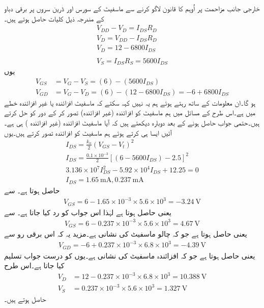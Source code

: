 خارجی جانب مزاحمت پر اُوہم کا قانون لاگو کرنے سے ماسفیٹ کے سورس اور ڈرین سروں پر برقی دباو کے مندرجہ ذیل کلیات حاصل ہوتے ہیں۔
\begin{align*}
V_{DD}-V_{D}=I_{DS}R_D\\
V_D=V_{DD}-I_{DS}R_D\\
V_D=12  - 6800 I_{DS}\\
\\
V_S=I_{DS}R_S=5600I_{DS}
\end{align*}
یوں
\begin{align*}
V_{GS}&=V_G -V_S = (6)-(5600 I_{DS})\\
V_{GD}&=V_G -V_D = (6)-\left(12-6800I_{DS} \right )=-6+6800I_{DS}
\end{align*}
ہو گا۔ان معلومات کے ساتھ رہتے ہوئے ہم یہ نہیں کہہ سکتے کہ ماسفیٹ افزائندہ یا غیر افزائندہ خطے میں ہے۔اس طرح کے مسائل میں ہم ماسفیٹ کو افزائندہ (غیر افزائندہ) تصور کر کے دور کو حل کرتے ہیں۔حتمی جواب حاصل ہونے کے بعد دوبارہ دیکھتے ہیں کہ آیا ماسفیٹ افزائندہ (غیر افزائندہ ) ہی ہے۔آئیں ایسا ہی کرتے ہوئے ہم ماسفیٹ کو افزائندہ تصور کرتے ہیں۔یوں
\begin{align*}
I_{DS}=\frac{k_n}{2} \left (V_{GS}-V_t \right )^{2}\\
I_{DS}=\frac{0.1 \times 10^{-3}}{2} \left[\left(6-5600 I_{DS}\right)-2.5 \right ]^2 \\
3.136 \times 10^{7} I_{DS}^{2}-5.92 \times 10^{4} I_{DS}+12.25=0\\
I_{DS}=\SI{1.65}{\milli \ampere} , \SI{0.237}{\milli \ampere}
\end{align*}
حاصل ہوتا ہے۔   سے 
\begin{align*}
V_{GS}=6-1.65 \times 10^{-3} \times 5.6 \times 10^{3}=\SI{-3.24}{\volt}
\end{align*}
یعنی   حاصل ہوتا ہے لہٰذا اس جواب کو رد کیا جاتا ہے۔  سے
\begin{align*}
V_{GS}=6-0.237 \times 10^{-3} \times 5.6 \times 10^{3}=\SI{4.67}{\volt}
\end{align*}
یعنی   حاصل ہوتا ہے جو کہ چالو ماسفیٹ کی نشانی ہے۔مزید یہ کہ اس برقی رو سے
\begin{align*}
V_{GD}=-6+0.237 \times 10^{-3} \times 6.8 \times 10^{3}=\SI{-4.39}{\volt}
\end{align*}
یعنی  حاصل ہوتا ہے جو کہ افزائندہ ماسفیٹ کی نشانی ہے۔یوں     کو درست جواب تسلیم کیا جاتا ہے۔اس طرح
\begin{align*}
V_D&=12-0.237 \times 10^{-3} \times 6.8 \times 10^{3}=\SI{10.388}{\volt}\\
V_S&=0.237 \times 10^{-3} \times 5.6 \times 10^{3}=\SI{1.327}{\volt}
\end{align*}
حاصل ہوتے ہیں۔

